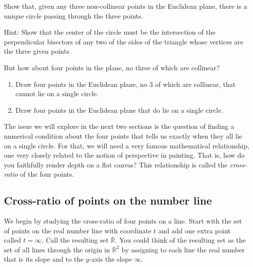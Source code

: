 \begin{exercise}
Show that, given any three non-collinear points in the Euclidean
plane, there is a unique circle passing through the three points.

Hint: Show that the center of the circle must be the intersection of
the perpendicular bisectors of any two of the sides of the triangle
whose vertices are the three given points.
\end{exercise}

But how about four points in the plane, no three of which are
collinear?

\begin{exercise}
\begin{enumerate}
\item Draw four points in the Euclidean plane, no $3$ of which are collinear, that cannot lie on a single circle.
\item Draw four points in the Euclidean plane that do lie on a single
circle.
\end{enumerate}
\end{exercise}

The issue we will explore in the next two sections is the question of
finding a numerical condition about the four points that tells us
exactly when they all lie on a single circle. For that, we will need a
very famous mathematical relationship, one very closely related to the
notion of perspective in painting. That is, how do you faithfully
render depth on a flat canvas? This relationship is called
the \textit{cross-ratio} of the four points.

\subsection*{Cross-ratio of points on the number line}

We begin by studying the cross-ratio of four points on a line. Start
with the set of points on the real number line with coordinate $t$ and
add one extra point called $t=\infty$. Call the resulting set
$\overline{\mathbb{R}}$. You could think of the resulting set as the
set of all lines through the origin in $\mathbb{R}^{2}$ by assigning
to each line the real number that is its slope and to the $y$-axis the
slope $\infty$.

